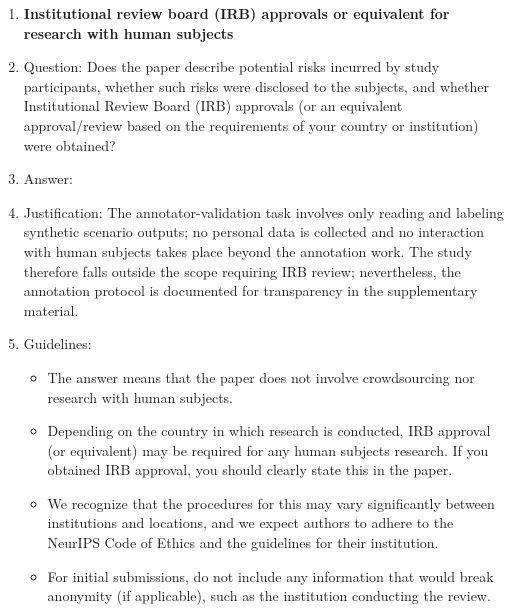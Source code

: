 \begin{enumerate}
\item {\bf Institutional review board (IRB) approvals or equivalent for research with human subjects}
    \item[] Question: Does the paper describe potential risks incurred by study participants, whether such risks were disclosed to the subjects, and whether Institutional Review Board (IRB) approvals (or an equivalent approval/review based on the requirements of your country or institution) were obtained?
    \item[] Answer: \answerNA{}
    \item[] Justification: The annotator-validation task involves only reading and labeling synthetic scenario outputs; no personal data is collected and no interaction with human subjects takes place beyond the annotation work. The study therefore falls outside the scope requiring IRB review; nevertheless, the annotation protocol is documented for transparency in the supplementary material.
    \item[] Guidelines:
    \begin{itemize}
        \item The answer \answerNA{} means that the paper does not involve crowdsourcing nor research with human subjects.
        \item Depending on the country in which research is conducted, IRB approval (or equivalent) may be required for any human subjects research. If you obtained IRB approval, you should clearly state this in the paper.
        \item We recognize that the procedures for this may vary significantly between institutions and locations, and we expect authors to adhere to the NeurIPS Code of Ethics and the guidelines for their institution.
        \item For initial submissions, do not include any information that would break anonymity (if applicable), such as the institution conducting the review.
    \end{itemize}


\end{enumerate}
